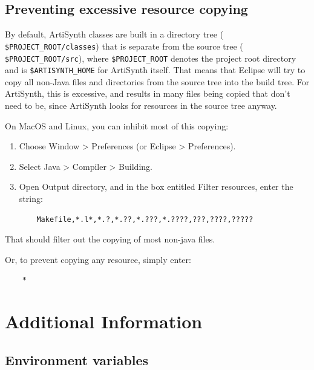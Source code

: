 \documentclass{article}
\def\SEP{/}
\def\directory{directory }
\def\directories{directories }
\begin{document}
\subsection{Preventing excessive resource copying}

By default, ArtiSynth classes are built in a \directory tree ({\tt
\$PROJECT\_ROOT\SEP classes}) that is separate from the source tree ({\tt
\$PROJECT\_ROOT\SEP src}), where {\tt \$PROJECT\_ROOT} denotes the project
root \directory and is {\tt \$ARTISYNTH\_HOME} for ArtiSynth itself.
That means that Eclipse will try to copy all non-Java files and
\directories from the source tree into the build tree. For ArtiSynth,
this is excessive, and results in many files being copied that don't
need to be, since ArtiSynth looks for resources in the source tree
anyway.

On MacOS and Linux, you can inhibit most of this copying:

\begin{enumerate}

\item Choose {\sf Window > Preferences} (or {\sf Eclipse > Preferences}).

\item Select {\sf Java > Compiler > Building}.

\item Open {\sf Output directory}, and in the box entitled {\sf Filter resources},
  enter the string:

\begin{lstlisting}
    Makefile,*.l*,*.?,*.??,*.???,*.????,???,????,?????
\end{lstlisting}

\end{enumerate}

That should filter out the copying of most non-java files.

Or, to prevent copying any resource, simply enter: 
\begin{lstlisting}
    *
\end{lstlisting}

\section{Additional Information}

\subsection{Environment variables}
\label{EnvironmentVariables}
\end{document}
